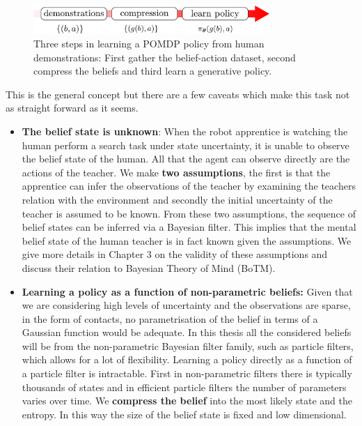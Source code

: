 \begin{figure}
 \centering
 \includegraphics[width=0.8\textwidth]{./ch2-Background/Figures/belief_pipeline.pdf}
 \caption{Three steps in learning a POMDP policy from human demonstrations: First gather the belief-action dataset, second compress the beliefs and third 
 learn a generative policy.}
 \label{fig:belief-pipeline}
\end{figure}

This is the general 
concept but there are a few caveats which make this task not as straight forward as it seems.

\begin{itemize}
 \item \textbf{The belief state is unknown}: When the robot apprentice is watching the human perform a search task under state uncertainty, it is 
 unable to observe the belief state of the human. All that the agent can observe directly are the actions of the teacher. We make \textbf{two assumptions}, the first 
 is that the apprentice can infer the observations of the teacher by examining the teachers relation with the environment and secondly the initial uncertainty of the 
 teacher is assumed to be known. From these two assumptions, the sequence of belief states can be inferred via a Bayesian filter. This implies that  the mental 
 belief state of the human teacher is in fact known given the assumptions. We give more details in Chapter 3 on the validity of these assumptions
 and discuss their relation to Bayesian Theory of Mind (BoTM).
 
 \item \textbf{Learning a policy as a function of non-parametric beliefs:} Given that we are considering high levels of uncertainty and the 
 observations are sparse, in the form of contacts, no parametrisation of the belief in terms of a Gaussian function would be adequate. In this thesis all the considered beliefs will be from the non-parametric 
 Bayesian filter family, such as particle filters, which allows for a lot of flexibility. Learning a policy directly as a function of a particle filter is intractable. First 
 in non-parametric filters there is typically thousands of states and in efficient particle filters the number of parameters varies over time.
 We \textbf{compress the belief} into the most likely state and the entropy. In this way the size of the belief state is fixed and low dimensional.
\end{itemize}
 
